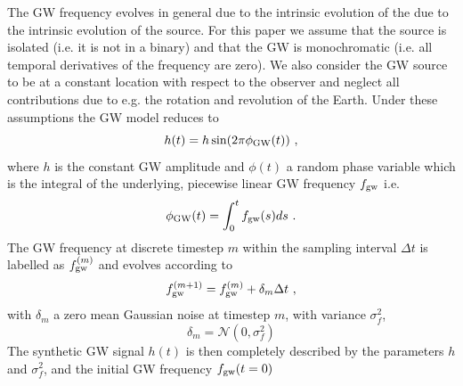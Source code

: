 \documentclass[pra,superscriptaddress,reprint,amsmath,amssymb,nofootinbib]{revtex4-2}
\begin{document}
The GW frequency evolves in general due to  the intrinsic evolution of the due to the intrinsic evolution of the source. For this paper  we assume that the source is isolated (i.e. it is not in a binary) and that the GW is monochromatic (i.e. all temporal derivatives of the frequency are zero). We also consider the GW source to be at a constant location with respect to the observer and neglect all contributions due to e.g. the rotation and revolution of the Earth. Under these assumptions the GW model reduces to 
\begin{equation}
	h(t) = h\sin(2\pi \phi_{\rm GW}(t)) \ , 
\end{equation}
where $h$ is the constant GW amplitude and $\phi(t)$ a random phase variable which is the integral of the underlying, piecewise linear GW frequency $f_{\rm gw}$ i.e.
\begin{equation}
	\phi_{\rm GW}(t) = \int_{0}^{t} f_{\rm gw}(s) ds \ .
\end{equation}
The GW frequency at discrete timestep $m$ within the sampling interval $\Delta t$ is labelled as $f_{\rm gw}^{(m)}$ and evolves according to
\begin{eqnarray}
	f_{\rm gw}^{(m+1)} = f_{\rm gw}^{(m)} + \delta_m \Delta t \ ,
\end{eqnarray}
with $\delta_m$ a zero mean Gaussian noise at timestep $m$, with variance $\sigma_f^2$,
\begin{equation}
	\delta_m = \mathcal{N}(0, \sigma_f^2) \label{eq:gwfreqnoise}
\end{equation}
The synthetic GW signal $h(t)$ is then completely described by the parameters $h$ and $\sigma_f^2$, and the initial GW frequency $f_{\rm gw}(t=0)$ \newline 
\end{document}
